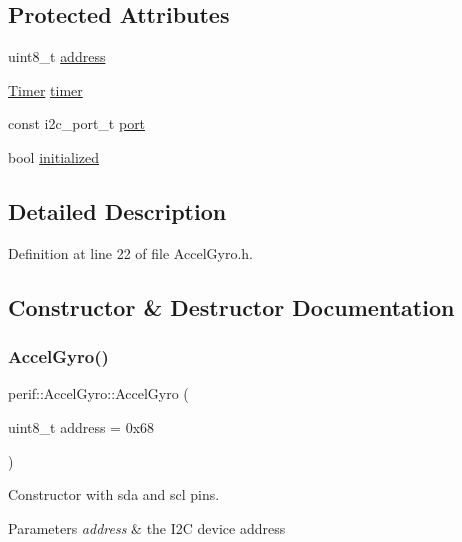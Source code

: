 \subsection*{Protected Attributes}
\begin{DoxyCompactItemize}
\item 
uint8\+\_\+t \mbox{\hyperlink{classperif_1_1I2CPerif_a3275bcc89b3d8ddfa221fb76669c2d45}{address}}
\item 
\mbox{\hyperlink{classTimer}{Timer}} \mbox{\hyperlink{classperif_1_1Perif_acfa1256201bead82ccce1a0a8bcc24e1}{timer}}
\item 
const i2c\+\_\+port\+\_\+t \mbox{\hyperlink{classI2Cdev_a1d1e63732aa9f50369172b27a034129c}{port}}
\item 
bool \mbox{\hyperlink{classI2Cdev_a94b914bfcbd0fe1f6fdd7b9c6f4ab921}{initialized}}
\end{DoxyCompactItemize}


\subsection{Detailed Description}


Definition at line 22 of file Accel\+Gyro.\+h.



\subsection{Constructor \& Destructor Documentation}
\mbox{\label{classperif_1_1AccelGyro_abb2b2920505708a2108e95fa4d6fd433}} 
\subsubsection{\texorpdfstring{AccelGyro()}{AccelGyro()}}
{\footnotesize\ttfamily perif\+::\+Accel\+Gyro\+::\+Accel\+Gyro (\begin{DoxyParamCaption}\item[{uint8\+\_\+t}]{address = {\ttfamily 0x68} }\end{DoxyParamCaption})\hspace{0.3cm}{\ttfamily [explicit]}}

Constructor with sda and scl pins.


\begin{DoxyParams}{Parameters}
{\em address} & the I2C device address \\
\hline
\end{DoxyParams}


